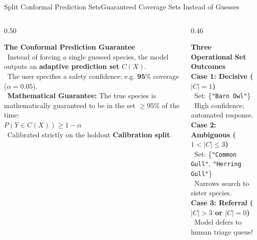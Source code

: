 \documentclass[aspectratio=169,10pt]{beamer}
\begin{document}
\begin{frame}{Split Conformal Prediction Sets}{Guaranteed Coverage Sets Instead of Guesses}
    \begin{columns}[T]
        \begin{column}{0.50\textwidth}
            \begin{bluecard}
                \textbf{\color{BlueAccent} The Conformal Prediction Guarantee}\\[3pt]
                \textbullet\ Instead of forcing a single guessed species, the model outputs an \textbf{adaptive prediction set} $C(X)$.\\[2pt]
                \textbullet\ The user specifies a safety confidence: e.g. $\mathbf{95\%}$ coverage ($\alpha = 0.05$).\\[2pt]
                \textbullet\ \textbf{Mathematical Guarantee:} The true species is mathematically guaranteed to be in the set $\ge 95\%$ of the time:\\[1pt]
                \quad $P(Y \in C(X)) \ge 1 - \alpha$\\[2pt]
                \textbullet\ Calibrated strictly on the holdout \textbf{Calibration split}.
            \end{bluecard}
        \end{column}
        \begin{column}{0.46\textwidth}
            \begin{card}
                \textbf{\color{SlateDark} Three Operational Set Outcomes}\\[4pt]
                \textbf{Case 1: Decisive ($|C| = 1$)}\\
                \textbullet\ Set: \{\texttt{"Barn Owl"}\}\\
                \textbullet\ High confidence; automated response.\\[4pt]
                \textbf{Case 2: Ambiguous ($1 < |C| \le 3$)}\\
                \textbullet\ Set: \{\texttt{"Common Gull"}, \texttt{"Herring Gull"}\}\\
                \textbullet\ Narrows search to sister species.\\[4pt]
                \textbf{Case 3: Referral ($|C| > 3$ or $|C| = 0$)}\\
                \textbullet\ Model defers to human triage queue!
            \end{card}
        \end{column}
    \end{columns}
\end{frame}
\end{document}
